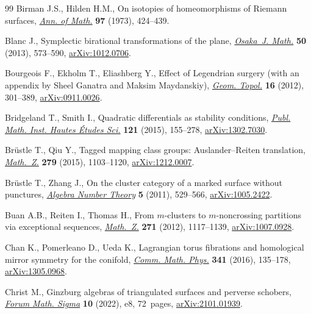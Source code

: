 \documentclass[10pt,a4paper]{amsart}
\theoremstyle{definition}
\numberwithin{equation}{section}
\begin{document}
\begin{thebibliography}{99}
Birman J.S., Hilden H.M., On isotopies of homeomorphisms of {R}iemann surfaces,
 \href{https://doi.org/10.2307/1970830}{\textit{Ann. of Math.}} \textbf{97}
 (1973), 424--439.

Blanc J., Symplectic birational transformations of the plane,
 \href{https://doi.org/10.18910/25084}{\textit{Osaka~J. Math.}} \textbf{50}
 (2013), 573--590, \href{http://arxiv.org/abs/1012.0706}{arXiv:1012.0706}.

Bourgeois F., Ekholm T., Eliashberg Y., Effect of {L}egendrian surgery (with an
 appendix by {S}heel {G}anatra and {M}aksim {M}aydanskiy),
 \href{https://doi.org/10.2140/gt.2012.16.301}{\textit{Geom. Topol.}}
 \textbf{16} (2012), 301--389,
 \href{http://arxiv.org/abs/0911.0026}{arXiv:0911.0026}.

Bridgeland T., Smith I., Quadratic differentials as stability conditions,
 \href{https://doi.org/10.1007/s10240-014-0066-5}{\textit{Publ. Math. Inst.
 Hautes \'{E}tudes Sci.}} \textbf{121} (2015), 155--278,
 \href{http://arxiv.org/abs/1302.7030}{arXiv:1302.7030}.

Br\"{u}stle T., Qiu Y., Tagged mapping class groups: {A}uslander--{R}eiten
 translation,
 \href{https://doi.org/10.1007/s00209-015-1405-z}{\textit{Math.~Z.}}
 \textbf{279} (2015), 1103--1120,
 \href{http://arxiv.org/abs/1212.0007}{arXiv:1212.0007}.

Br\"{u}stle T., Zhang J., On the cluster category of a marked surface without
 punctures, \href{https://doi.org/10.2140/ant.2011.5.529}{\textit{Algebra
 Number Theory}} \textbf{5} (2011), 529--566,
 \href{http://arxiv.org/abs/1005.2422}{arXiv:1005.2422}.

Buan A.B., Reiten I., Thomas H., From {$m$}-clusters to {$m$}-noncrossing
 partitions via exceptional sequences,
 \href{https://doi.org/10.1007/s00209-011-0906-7}{\textit{Math.~Z.}}
 \textbf{271} (2012), 1117--1139,
 \href{http://arxiv.org/abs/1007.0928}{arXiv:1007.0928}.

Chan K., Pomerleano D., Ueda K., Lagrangian torus fibrations and homological
 mirror symmetry for the conifold,
 \href{https://doi.org/10.1007/s00220-015-2477-7}{\textit{Comm. Math. Phys.}}
 \textbf{341} (2016), 135--178,
 \href{http://arxiv.org/abs/1305.0968}{arXiv:1305.0968}.

Christ M., Ginzburg algebras of triangulated surfaces and perverse schobers,
 \href{https://doi.org/10.1017/fms.2022.1}{\textit{Forum Math. Sigma}}
 \textbf{10} (2022), e8, 72~pages,
 \href{http://arxiv.org/abs/2101.01939}{arXiv:2101.01939}.


\end{thebibliography}
\end{document}
